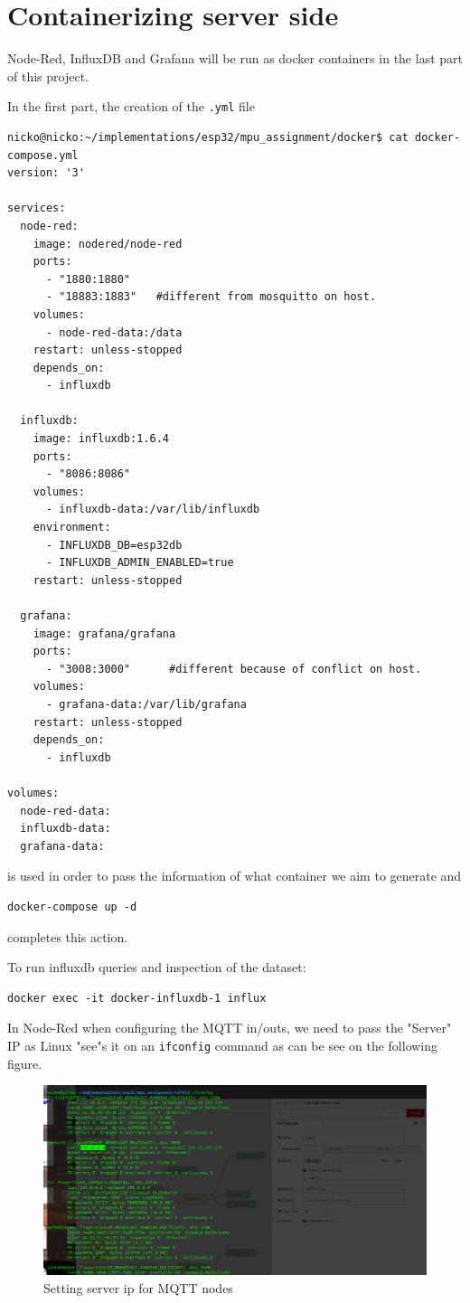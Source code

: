 \documentclass[a4paper,12pt]{article}
\begin{document}
\section{Containerizing server side}


Node-Red, InfluxDB and Grafana will be run as docker containers in the last part of this project.

In the first part, the creation of the \texttt{.yml} file

{\scriptsize
\begin{verbatim}
nicko@nicko:~/implementations/esp32/mpu_assignment/docker$ cat docker-compose.yml 
version: '3'

services:
  node-red:
    image: nodered/node-red
    ports:
      - "1880:1880"
      - "18883:1883"   #different from mosquitto on host.
    volumes:
      - node-red-data:/data
    restart: unless-stopped
    depends_on:
      - influxdb

  influxdb:
    image: influxdb:1.6.4
    ports:
      - "8086:8086"
    volumes:
      - influxdb-data:/var/lib/influxdb
    environment:
      - INFLUXDB_DB=esp32db
      - INFLUXDB_ADMIN_ENABLED=true
    restart: unless-stopped

  grafana:
    image: grafana/grafana
    ports:
      - "3008:3000"      #different because of conflict on host.
    volumes:
      - grafana-data:/var/lib/grafana
    restart: unless-stopped
    depends_on:
      - influxdb

volumes:
  node-red-data:
  influxdb-data:
  grafana-data:

\end{verbatim}
}

is used in order to pass the information of what container we aim to generate
and 
{\scriptsize
\begin{verbatim}
docker-compose up -d
\end{verbatim}
}
completes this action.

To run influxdb queries and inspection of the dataset:
{\scriptsize
\begin{verbatim}
docker exec -it docker-influxdb-1 influx
\end{verbatim}
}


In Node-Red when configuring the MQTT in/outs, we need to pass the "Server" IP as Linux "see"s it on an \texttt{ifconfig} command as can be
see on the following figure.

		\begin{figure}[H]
			\centering
			\includegraphics[width=1\textwidth]{doc1.png}
			\caption{Setting server ip for MQTT nodes}
			\label{fig1:}
		\end{figure}		
\end{document}
